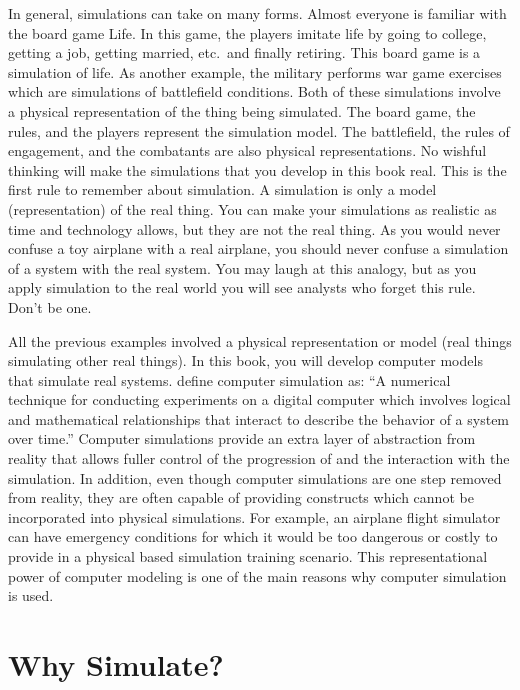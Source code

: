 \documentclass[
]{book}
\theoremstyle{definition}
\theoremstyle{definition}
\theoremstyle{definition}
\theoremstyle{definition}
\theoremstyle{remark}
\begin{document}
In general, simulations can take on many forms. Almost everyone is
familiar with the board game Life. In this game, the players imitate
life by going to college, getting a job, getting married, etc.~and
finally retiring. This board game is a simulation of life. As another
example, the military performs war game exercises which are simulations
of battlefield conditions. Both of these simulations involve a physical
representation of the thing being simulated. The board game, the rules,
and the players represent the simulation model. The battlefield, the
rules of engagement, and the combatants are also physical
representations. No wishful thinking will make the simulations that you
develop in this book real. This is the first rule to remember about
simulation. A simulation is only a model (representation) of the real
thing. You can make your simulations as realistic as time and technology
allows, but they are not the real thing. As you would never confuse a
toy airplane with a real airplane, you should never confuse a simulation
of a system with the real system. You may laugh at this analogy, but as
you apply simulation to the real world you will see analysts who forget
this rule. Don't be one.

All the previous examples involved a physical representation or model
(real things simulating other real things). In this book, you will
develop computer models that simulate real systems. \citet{ravindran1987and}
define computer simulation as: ``A numerical technique for conducting
experiments on a digital computer which involves logical and
mathematical relationships that interact to describe the behavior of a
system over time.'' Computer simulations provide an extra layer of
abstraction from reality that allows fuller control of the progression
of and the interaction with the simulation. In addition, even though
computer simulations are one step removed from reality, they are often
capable of providing constructs which cannot be incorporated into
physical simulations. For example, an airplane flight simulator can have
emergency conditions for which it would be too dangerous or costly to
provide in a physical based simulation training scenario. This
representational power of computer modeling is one of the main reasons
why computer simulation is used.

\hypertarget{why-simulate}{%
\section{Why Simulate?}\label{why-simulate}}
\end{document}

